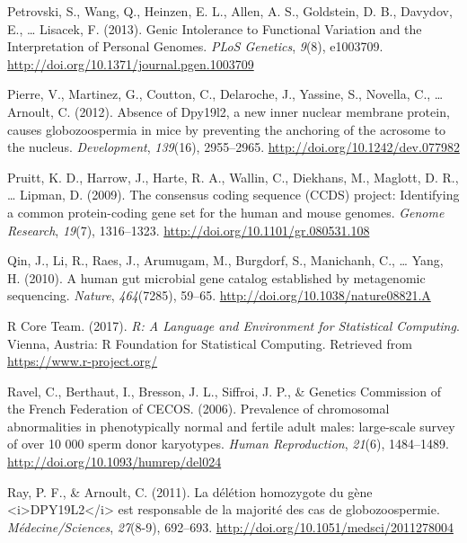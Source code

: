 \documentclass[12pt,twoside]{reedthesis}
\theoremstyle{definition}
\theoremstyle{definition}
\theoremstyle{remark}
\begin{document}
  \hypertarget{ref-Petrovski2013}{}
  Petrovski, S., Wang, Q., Heinzen, E. L., Allen, A. S., Goldstein, D. B.,
  Davydov, E., \ldots{} Lisacek, F. (2013). Genic Intolerance to
  Functional Variation and the Interpretation of Personal Genomes.
  \emph{PLoS Genetics}, \emph{9}(8), e1003709.
  \url{http://doi.org/10.1371/journal.pgen.1003709}
  
  \hypertarget{ref-Pierre2012}{}
  Pierre, V., Martinez, G., Coutton, C., Delaroche, J., Yassine, S.,
  Novella, C., \ldots{} Arnoult, C. (2012). Absence of Dpy19l2, a new
  inner nuclear membrane protein, causes globozoospermia in mice by
  preventing the anchoring of the acrosome to the nucleus.
  \emph{Development}, \emph{139}(16), 2955--2965.
  \url{http://doi.org/10.1242/dev.077982}
  
  \hypertarget{ref-Pruitt2009}{}
  Pruitt, K. D., Harrow, J., Harte, R. A., Wallin, C., Diekhans, M.,
  Maglott, D. R., \ldots{} Lipman, D. (2009). The consensus coding
  sequence (CCDS) project: Identifying a common protein-coding gene set
  for the human and mouse genomes. \emph{Genome Research}, \emph{19}(7),
  1316--1323. \url{http://doi.org/10.1101/gr.080531.108}
  
  \hypertarget{ref-Qin2010}{}
  Qin, J., Li, R., Raes, J., Arumugam, M., Burgdorf, S., Manichanh, C.,
  \ldots{} Yang, H. (2010). A human gut microbial gene catalog established
  by metagenomic sequencing. \emph{Nature}, \emph{464}(7285), 59--65.
  \url{http://doi.org/10.1038/nature08821.A}
  
  \hypertarget{ref-RCoreTeam2017}{}
  R Core Team. (2017). \emph{R: A Language and Environment for Statistical
  Computing}. Vienna, Austria: R Foundation for Statistical Computing.
  Retrieved from \url{https://www.r-project.org/}
  
  \hypertarget{ref-Ravel2006}{}
  Ravel, C., Berthaut, I., Bresson, J. L., Siffroi, J. P., \& Genetics
  Commission of the French Federation of CECOS. (2006). Prevalence of
  chromosomal abnormalities in phenotypically normal and fertile adult
  males: large-scale survey of over 10 000 sperm donor karyotypes.
  \emph{Human Reproduction}, \emph{21}(6), 1484--1489.
  \url{http://doi.org/10.1093/humrep/del024}
  
  \hypertarget{ref-Ray2011}{}
  Ray, P. F., \& Arnoult, C. (2011). La délétion homozygote du gène
  \textless{}i\textgreater{}DPY19L2\textless{}/i\textgreater{} est
  responsable de la majorité des cas de globozoospermie.
  \emph{Médecine/Sciences}, \emph{27}(8-9), 692--693.
  \url{http://doi.org/10.1051/medsci/2011278004}
  
\end{document}
